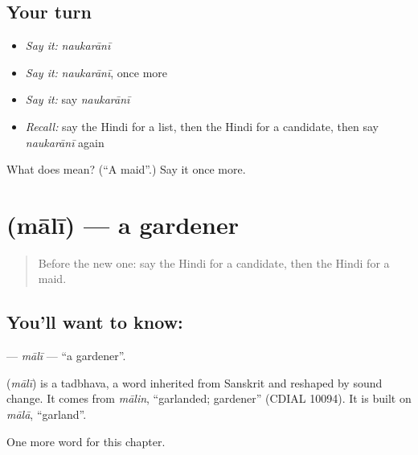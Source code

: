 \subsection*{Your turn}
\begin{itemize}
\raggedright
  \item \emph{Say it:} \emph{naukarānī}
  \item \emph{Say it:} \emph{naukarānī}, once more
  \item \emph{Say it:} say \emph{naukarānī}
  \item \emph{Recall:} say the Hindi for a list, then the Hindi for a candidate, then say \emph{naukarānī} again
\end{itemize}

\begin{tcolorbox}[breakable,colback=teal!4,colframe=teal!35!black,title={Before you move on}]
What does  mean? (\textquotedblleft{}A maid\textquotedblright{}.) Say it once more.
\end{tcolorbox}
\section[\texorpdfstring{\hi{माली} (mālī)}{माली (mālī)}]{ (mālī) — a gardener}

\label{lesson:HI-C261-mali}



\begin{quote}
Before the new one: say the Hindi for a candidate, then the Hindi for a maid.
\end{quote}

\subsection*{You'll want to know: }
\textbf{} — \emph{mālī} — \textquotedblleft{}a gardener\textquotedblright{}.

\begin{cousinweb}
\textbf{} (\emph{mālī}) is a tadbhava, a word inherited from Sanskrit and reshaped by sound change. It comes from \emph{mālin}, \textquotedblleft{}garlanded; gardener\textquotedblright{} (CDIAL 10094). It is built on \emph{mālā}, \textquotedblleft{}garland\textquotedblright{}.
\end{cousinweb}

\begin{grammarlens}[title={What you've built}]
One more word for this chapter.
\end{grammarlens}

